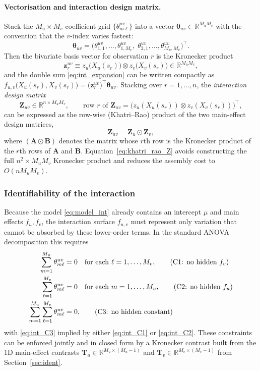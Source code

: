 \paragraph{Vectorisation and interaction design matrix.}
Stack the $M_u\times M_v$ coefficient grid $\{\theta^{uv}_{m\ell}\}$ into a vector
$\boldsymbol\theta_{uv}\in\mathbb{R}^{M_uM_v}$ with the convention that the $v$-index
varies fastest:
\[
\boldsymbol\theta_{uv}
=\big(\theta^{uv}_{1,1},\ldots,\theta^{uv}_{1,M_v},\;\theta^{uv}_{2,1},\ldots,\theta^{uv}_{M_u,M_v}\big)^\top.
\]
Then the bivariate basis vector for observation $r$ is the Kronecker product
\[
\boldsymbol z^{uv}_r\equiv z_u\!\big(X_u(s_r)\big)\otimes z_v\!\big(X_v(s_r)\big)\in\mathbb{R}^{M_uM_v},
\]
and the double sum \eqref{eq:int_expansion} can be written compactly as
$f_{u,v}\!\big(X_u(s_r),X_v(s_r)\big)=\big(\boldsymbol z^{uv}_r\big)^\top\boldsymbol\theta_{uv}$.
Stacking over $r=1,\ldots,n$, the \emph{interaction design matrix}
\[
\mathbf Z_{uv}\in\mathbb{R}^{n\times M_uM_v},
\qquad
\text{row }r\text{ of }\mathbf Z_{uv}=\big(z_u(X_u(s_r))\otimes z_v(X_v(s_r))\big)^\top,
\]
can be expressed as the row-wise (Khatri--Rao) product of the two main-effect design
matrices,
\begin{equation}
\mathbf Z_{uv}=\mathbf Z_u\odot \mathbf Z_v,
\label{eq:khatri_rao_Z}
\end{equation}
where $(\mathbf A\odot \mathbf B)$ denotes the matrix whose $r$th row is the Kronecker
product of the $r$th rows of $\mathbf A$ and $\mathbf B$. Equation~\eqref{eq:khatri_rao_Z}
avoids constructing the full $n^2\times M_uM_v$ Kronecker product and reduces the assembly
cost to $O(nM_uM_v)$.

\subsubsection{Identifiability of the interaction}\label{sec:int_ident}
Because the model \eqref{eq:model_int} already contains an intercept $\mu$ and main effects
$f_u,f_v$, the interaction surface $f_{u,v}$ must represent only variation that cannot be
absorbed by these lower-order terms. In the standard ANOVA decomposition this requires
\begin{align}
\sum_{m=1}^{M_u}\theta^{uv}_{m\ell}&=0\quad\text{for each }\ell=1,\ldots,M_v,
 \tag{\text{C1}: no hidden $f_v$}\label{eq:int_C1}\\
\sum_{\ell=1}^{M_v}\theta^{uv}_{m\ell}&=0\quad\text{for each }m=1,\ldots,M_u,
 \tag{\text{C2}: no hidden $f_u$}\label{eq:int_C2}\\
\sum_{m=1}^{M_u}\sum_{\ell=1}^{M_v}\theta^{uv}_{m\ell}&=0,
 \tag{\text{C3}: no hidden constant}\label{eq:int_C3}
\end{align}
with \eqref{eq:int_C3} implied by either \eqref{eq:int_C1} or \eqref{eq:int_C2}. These
constraints can be enforced jointly and in closed form by a Kronecker contrast built from
the 1D main-effect contrasts $\mathbf T_u\in\mathbb{R}^{M_u\times(M_u-1)}$ and
$\mathbf T_v\in\mathbb{R}^{M_v\times(M_v-1)}$ from Section~\ref{sec:ident}.

